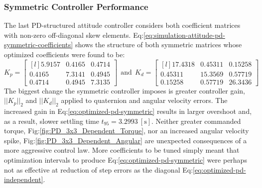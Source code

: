 \subsubsection{Symmetric Controller Performance}
\label{subsubsec:simulation.atttiude.pd.3x3}
The last PD-structured attitude controller considers both coefficient matrices with non-zero off-diagonal skew elements. Eq:\ref{eq:simulation-attitude-pd-symmetric-coefficients} shows the structure of both symmetric matrices whose optimized coefficients were found to be:
\begin{equation}\label{eq:optimized-pd-symmetric}
K_p = \begin{bmatrix*}[l]
5.9157 & 0.4165 & 0.4714\\
0.4165 & 7.3141 & 0.4945\\
0.4714 & 0.4945 & 7.3135
\end{bmatrix*}
~~\text{and}~~K_d = \begin{bmatrix*}[l]
17.4318 & 0.45311 & 0.15258\\
0.45311 & 15.3569 & 0.57719\\
0.15258 & 0.57719 & 26.3436
\end{bmatrix*}
\end{equation}
The biggest change the symmetric controller imposes is greater controller gain, $||K_p||_2$ and $||K_d||_2$ applied to quaternion and angular velocity errors. The increased gain in Eq:\ref{eq:optimized-pd-symmetric} results in larger overshoot and, as a result, slower settling time $t_{95}=3.2993~[\text{s}]$. Neither greater commanded torque, Fig:\ref{fig:PD_3x3_Dependent_Torque}, nor an increased angular velocity spike, Fig:\ref{fig:PD_3x3_Dependent_Angular} are unexpected consequences of a more aggressive control law. More coefficients to be tuned simply meant that optimization intervals to produce Eq:\ref{eq:optimized-pd-symmetric} were perhaps not as effective at reduction of step errors as the diagonal Eq:\ref{eq:optimized-pd-independent}.
